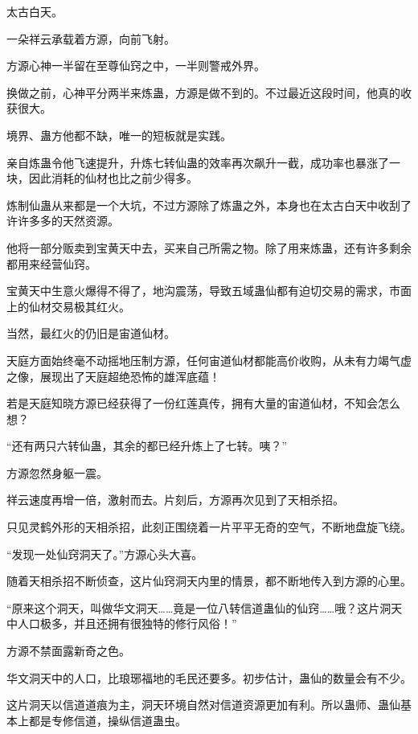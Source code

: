 
\begin{this_body}

太古白天。

一朵祥云承载着方源，向前飞射。

方源心神一半留在至尊仙窍之中，一半则警戒外界。

换做之前，心神平分两半来炼蛊，方源是做不到的。不过最近这段时间，他真的收获很大。

境界、蛊方他都不缺，唯一的短板就是实践。

亲自炼蛊令他飞速提升，升炼七转仙蛊的效率再次飙升一截，成功率也暴涨了一块，因此消耗的仙材也比之前少得多。

炼制仙蛊从来都是一个大坑，不过方源除了炼蛊之外，本身也在太古白天中收刮了许许多多的天然资源。

他将一部分贩卖到宝黄天中去，买来自己所需之物。除了用来炼蛊，还有许多剩余都用来经营仙窍。

宝黄天中生意火爆得不得了，地沟震荡，导致五域蛊仙都有迫切交易的需求，市面上的仙材交易极其红火。

当然，最红火的仍旧是宙道仙材。

天庭方面始终毫不动摇地压制方源，任何宙道仙材都能高价收购，从未有力竭气虚之像，展现出了天庭超绝恐怖的雄浑底蕴！

若是天庭知晓方源已经获得了一份红莲真传，拥有大量的宙道仙材，不知会怎么想？

“还有两只六转仙蛊，其余的都已经升炼上了七转。咦？”

方源忽然身躯一震。

祥云速度再增一倍，激射而去。片刻后，方源再次见到了天相杀招。

只见灵鹤外形的天相杀招，此刻正围绕着一片平平无奇的空气，不断地盘旋飞绕。

“发现一处仙窍洞天了。”方源心头大喜。

随着天相杀招不断侦查，这片仙窍洞天内里的情景，都不断地传入到方源的心里。

“原来这个洞天，叫做华文洞天……竟是一位八转信道蛊仙的仙窍……哦？这片洞天中人口极多，并且还拥有很独特的修行风俗！”

方源不禁面露新奇之色。

华文洞天中的人口，比琅琊福地的毛民还要多。初步估计，蛊仙的数量会有不少。

这片洞天以信道道痕为主，洞天环境自然对信道资源更加有利。所以蛊师、蛊仙基本上都是专修信道，操纵信道蛊虫。


\end{this_body}
